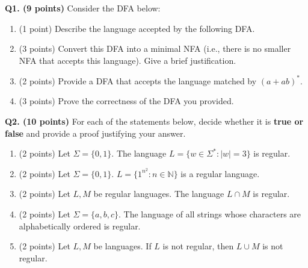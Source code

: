 \documentclass{article}
\begin{document}
    \noindent\textbf{Q1. (9 points)} Consider the DFA below:
    \begin{center}
    \end{center}
    \begin{enumerate}[label=\alph*)]
        \item (1 point) Describe the language accepted by the following DFA.

        \item (3 points) Convert this DFA into a minimal NFA (i.e., there is no smaller NFA that accepts this language). Give a brief justification.
        
        \pagebreak

        \item  (2 points) Provide a DFA that accepts the language matched by \((a+ab)^*\).
        \vfill
        \item (3 points) Prove the correctness of the DFA you provided.
    \end{enumerate}

    \pagebreak

    \noindent\textbf{Q2. (10 points)} For each of the statements below, decide whether it is \textbf{true or false} and provide a proof justifying your answer.

    \begin{enumerate}[label=\alph*)]
        \item (2 points) Let \(\Sigma = \{0, 1\}\). The language \(L = \{w \in \Sigma ^* : |w| = 3\}\) is regular.
        \vfill
        \item (2 points) Let \(\Sigma = \{0, 1\}\). \(L = \{1^{n^2} : n \in \mathbb{N}\}\) is a regular language.
        \vfill
        \item (2 points) Let \(L, M\) be regular languages. The language \(L \cap M\) is regular.
        \vfill
        \pagebreak
        \item (2 points) Let \(\Sigma = \{a, b, c\}\). The language of all strings whose characters are alphabetically ordered is regular.
        \vfill
        \item (2 points) Let \(L, M\) be languages. If \(L\) is not regular, then \(L \cup M\) is not regular.
        \vfill
    \end{enumerate}
\end{document}
